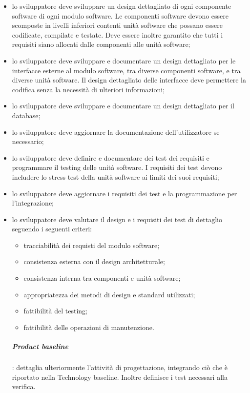 			\begin{itemize}
			\item lo sviluppatore deve sviluppare un design dettagliato di ogni componente software di ogni modulo software. Le componenti software devono essere scomposte in livelli inferiori contenti unità software che possano essere codificate, compilate e testate. Deve essere inoltre garantito che tutti i requisiti siano allocati dalle componenti alle unità software;
			\item lo sviluppatore deve sviluppare e documentare un design dettagliato per le interfacce esterne al modulo software, tra diverse componenti software, e tra diverse unità software. Il design dettagliato delle interfacce deve permettere la codifica senza la necessità di ulteriori informazioni;
			\item lo sviluppatore deve sviluppare e documentare un design dettagliato per il database;
			\item lo sviluppatore deve aggiornare la documentazione dell'utilizzatore se necessario;
			\item lo sviluppatore deve definire e documentare dei test dei requisiti e programmare il testing delle unità software. I requisiti dei test devono includere lo stress test della unità software ai limiti dei suoi requisiti;
			\item lo sviluppatore deve aggiornare i requisiti dei test e la programmazione per l'integrazione;
			\item lo sviluppatore deve valutare il design e i requisiti dei test di dettaglio seguendo i seguenti criteri:
			\begin{itemize}
			\item tracciabilità dei requisti del modulo software;
			\item consistenza esterna con il design architetturale;
			\item consistenza interna tra componenti e unità software;
			\item appropriatezza dei metodi di design e standard utilizzati;
			\item fattibilità del testing;
			\item fattibilità delle operazioni di manutenzione.
			\end{itemize}
			\subparagraph{Product baseline}: dettaglia ulteriormente l'attività di progettazione, integrando ciò che è riportato nella Technology baseline\glo. Inoltre definisce i test necessari alla verifica.\newline \newline

\end{itemize}
